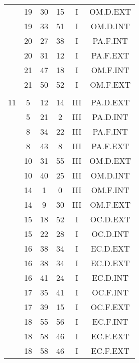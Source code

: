 \documentclass[12pt, a4paper]{article}
\begin{document}
\begin{multicols}{3}
{\begin{tabular}{c c c c c c}
	 	 	 	 & 19 & 30 & 15 & I & OM.D.EXT\\%
	 	 	 	 & 19 & 33 & 51 & I & OM.D.INT\\%
	 	 	 	 & 20 & 27 & 38 & I & PA.F.INT\\%
	 	 	 	 & 20 & 31 & 12 & I & PA.F.EXT\\%
	 	 	 	 & 21 & 47 & 18 & I & OM.F.INT\\%
	 	 	 	 & 21 & 50 & 52 & I & OM.F.EXT\\%
	 	 	 	 & & & & & \\%
	 	 	 	11 & 5 & 12 & 14 & III & PA.D.EXT\\%
	 	 	 	 & 5 & 21 & 2 & III & PA.D.INT\\%
	 	 	 	 & 8 & 34 & 22 & III & PA.F.INT\\%
	 	 	 	 & 8 & 43 & 8 & III & PA.F.EXT\\%
	 	 	 	 & 10 & 31 & 55 & III & OM.D.EXT\\%
	 	 	 	 & 10 & 40 & 25 & III & OM.D.INT\\%
	 	 	 	 & 14 & 1 & 0 & III & OM.F.INT\\%
	 	 	 	 & 14 & 9 & 30 & III & OM.F.EXT\\%
	 	 	 	 & 15 & 18 & 52 & I & OC.D.EXT\\%
	 	 	 	 & 15 & 22 & 28 & I & OC.D.INT\\%
	 	 	 	 & 16 & 38 & 34 & I & EC.D.EXT\\%
	 	 	 	 & 16 & 38 & 34 & I & EC.D.EXT\\%
	 	 	 	 & 16 & 41 & 24 & I & EC.D.INT\\%
	 	 	 	 & 17 & 35 & 41 & I & OC.F.INT\\%
	 	 	 	 & 17 & 39 & 15 & I & OC.F.EXT\\%
	 	 	 	 & 18 & 55 & 56 & I & EC.F.INT\\%
	 	 	 	 & 18 & 58 & 46 & I & EC.F.EXT\\%
	 	 	 	 & 18 & 58 & 46 & I & EC.F.EXT\\%
	 	 \end{tabular}
 	}
\end{multicols}
\end{document}
